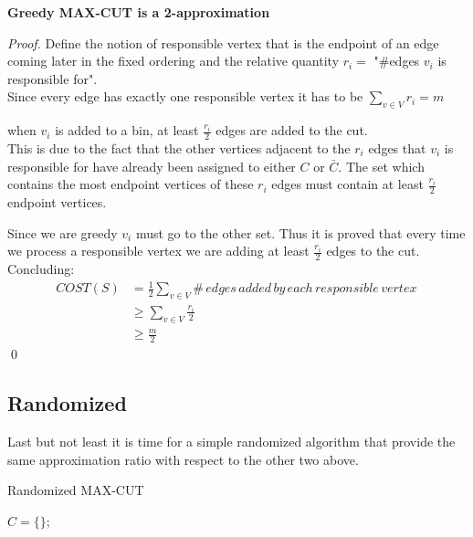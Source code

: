 \begin{theorem}{\textbf{Greedy MAX-CUT is a 2-approximation}}
\end{theorem}
\begin{proof}
  Define the notion of responsible vertex that is the endpoint of an edge coming later in the fixed ordering 
  and the relative quantity $r_i =$ "\#edges $v_i$ is responsible for".\\
  Since every edge has exactly one responsible vertex it has to be $\sum_{v \in V} r_i = m$
  \begin{claim}
  	when $ v_i $ is added to a bin, at least $ \frac{r_i}{2}$ edges are added to the cut.\\
  	This is due to the fact that the other vertices
  	adjacent to the $ r_i $ edges that $ v_i $ is responsible for have already been assigned to either $C$ or $ \bar{C} $. 
  	The set which contains the most endpoint vertices of these $ r_i $ edges must contain at least $ \frac{r_i}{2} $ endpoint vertices.

  \end{claim}
  Since we are greedy $ v_i $ must go to the other set. Thus it is proved that every time we process a responsible vertex we are adding at least $ \frac{r_i}{2}$ edges to the cut. Concluding:
  \begin{align*}
  	COST(S) & = \frac{1}{2} \sum_{v \in V} \#\, edges\,added\,by\,each \,responsible \,vertex\,\\ 
			& \geq \sum_{v \in V} \frac{r_i}{2}  \\
			& \geq \frac{m}{2}
\end{align*}
  \qed
\end{proof}


\subsection{Randomized}
Last but not least it is time for a simple randomized algorithm that provide the same approximation ratio with respect to the other two above.

\begin{algorithm}[H]
	\SetAlgoLined
	\caption{Randomized MAX-CUT}
	$C =\{\}$;\\
\end{algorithm}
\bigskip

